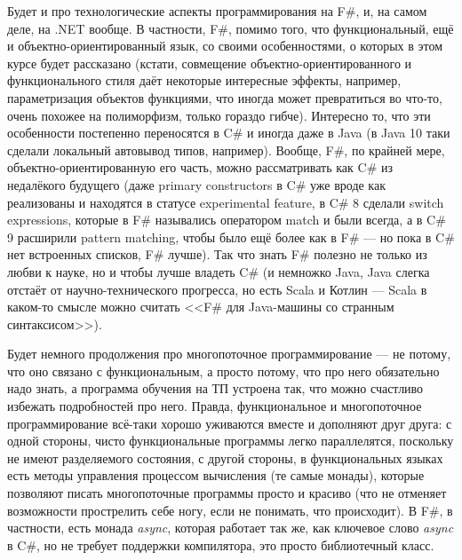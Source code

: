 \documentclass{../../text-style}
\begin{document}
Будет и про технологические аспекты программирования на F\#, и, на самом деле, на .NET вообще. В частности, F\#, помимо того, что функциональный, ещё и объектно-ориентированный язык, со своими особенностями, о которых в этом курсе будет рассказано (кстати, совмещение объектно-ориентированного и функционального стиля даёт некоторые интересные эффекты, например, параметризация объектов функциями, что иногда может превратиться во что-то, очень похожее на полиморфизм, только гораздо гибче). Интересно то, что эти особенности постепенно переносятся в C\# и иногда даже в Java (в Java 10 таки сделали локальный автовывод типов, например). Вообще, F\#, по крайней мере, объектно-ориентированную его часть, можно рассматривать как C\# из недалёкого будущего (даже primary constructors в C\# уже вроде как реализованы и находятся в статусе experimental feature, в C\# 8 сделали switch expressions, которые в F\# назывались оператором match и были всегда, а в C\# 9 расширили pattern matching, чтобы было ещё более как в F\# --- но пока в C\# нет встроенных списков, F\# лучше). Так что знать F\# полезно не только из любви к науке, но и чтобы лучше владеть C\# (и немножко Java, Java слегка отстаёт от научно-технического прогресса, но есть Scala и Котлин --- Scala в каком-то смысле можно считать <<F\# для Java-машины со странным синтаксисом>>).

Будет немного продолжения про многопоточное программирование --- не потому, что оно связано с функциональным, а просто потому, что про него обязательно надо знать, а программа обучения на ТП устроена так, что можно счастливо избежать подробностей про него. Правда, функциональное и многопоточное программирование всё-таки хорошо уживаются вместе и дополняют друг друга: с одной стороны, чисто функциональные программы легко параллелятся, поскольку не имеют разделяемого состояния, с другой стороны, в функциональных языках есть методы управления процессом вычисления (те самые монады), которые позволяют писать многопоточные программы просто и красиво (что не отменяет возможности прострелить себе ногу, если не понимать, что происходит). В F\#, в частности, есть монада \textit{async}, которая работает так же, как ключевое слово \textit{async} в C\#, но не требует поддержки компилятора, это просто библиотечный класс.
\end{document}
